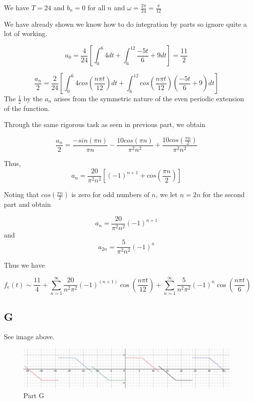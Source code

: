 \documentclass{article}
\begin{document}
We have $T=24$ and $b_n=0$ for all $n$ and $\omega = \frac{2\pi}{24} = \frac{\pi}{12}$

We have already shown we know how to do integration by parts so ignore quite a lot of working.

$$
a_0 = \frac{4}{24} \left[ \int_0^6 4 dt + \int_6^{12} \frac{-5t}{6} + 9 dt \right] = \frac{11}{2}
$$

$$
\frac{a_n}{2} = \frac{2}{24} \left[ \int_0^{6} 4 cos\left( \frac{n \pi t}{12} \right) dt + \int_6^{12} cos\left(\frac{n \pi t}{12}\right)\left(\frac{-5t}{6}+9\right)dt\right]
$$
The $\frac{1}{2}$ by the $a_n$ arises from the symmetric nature of the even periodic extension of the function.

Through the same rigorous task as seen in previous part, we obtain

$$
\frac{a_n}{2} = \frac{-sin(\pi n)}{\pi n} - \frac{10cos(\pi n)}{\pi^2 n^2} + \frac{10cos(\frac{\pi n}{2})}{\pi^2 n^2}
$$

Thus,
$$
a_n =\frac{20}{\pi^2n^2} \left[ \left(-1\right)^{n+1} +cos\left(\frac{\pi n}{2}\right) \right]
$$

Noting that $cos\left(\frac{\pi n}{2}\right)$ is zero for odd numbers of $n$, we let $n=2n$ for the second part and obtain

$$
a_n  =\frac{20}{\pi^2n^2} \left(-1\right)^{n+1}
$$
and
$$
a_{2n} = \frac{5}{\pi^2 n^2} \left(-1\right)^{n}
$$

Thus we have

$$
f_e(t) \sim \frac{11}{4}+\sum_{n=1}^{\infty}\frac{20}{n^{2}\pi^{2}}\left(-1\right)^{\left(n+1\right)}\cos\left(\frac{n\pi t}{12}\right) + \sum_{n=1}^{\infty}\frac{5}{n^{2}\pi^{2}}\left(-1\right)^{n}\cos\left(\frac{n\pi t}{6}\right)
$$

\subsection*{G}

See image above.

\begin{figure}
\centering
\includegraphics[width=1.0\textwidth]{./static/graph5.png}
\caption{Part G}
\end{figure}
\end{document}
